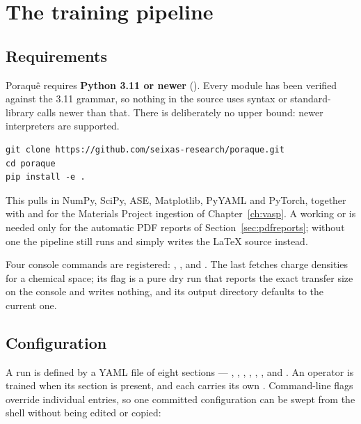 \chapter{The training pipeline}
\label{ch:pipeline}

\section{Requirements}
\label{sec:requirements}

\begin{pnote}
Poraqu\^e requires \textbf{Python 3.11 or newer}
(). Every module has been verified against the
3.11 grammar, so nothing in the source uses syntax or standard-library calls
newer than that. There is deliberately no upper bound: newer interpreters are
supported.
\end{pnote}

\begin{lstlisting}
git clone https://github.com/seixas-research/poraque.git
cd poraque
pip install -e .
\end{lstlisting}

This pulls in NumPy, SciPy, ASE, Matplotlib, PyYAML and PyTorch, together with
 and  for the Materials Project ingestion of
Chapter~\ref{ch:vasp}. A working  or  is needed only
for the automatic PDF reports of Section~\ref{sec:pdfreports}; without one the
pipeline still runs and simply writes the \LaTeX{} source instead.

Four console commands are registered: ,
,  and . The last
fetches charge densities for a chemical space; its  flag is a
pure dry run that reports the exact transfer size on the console and writes
nothing, and its output directory defaults to the current one.

\section{Configuration}

A run is defined by a YAML file of eight sections --- , ,
, , , ,
 and . An operator is trained when its section is
present, and each carries its own . Command-line flags override
individual entries, so one committed configuration can be swept from the shell
without being edited or copied:

